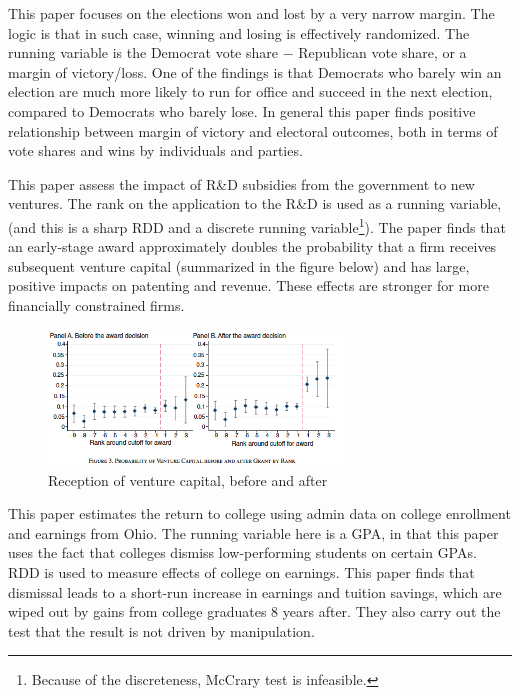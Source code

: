 \begin{mdframed}[backgroundcolor=yellow!5] 
\begin{example}[Lee, 2007] This paper focuses on the elections won and lost by a very narrow margin. The logic is that in such case, winning and losing is effectively randomized. The running variable is the Democrat vote share $-$ Republican vote share, or a margin of victory/loss. One of the findings is that Democrats who barely win an election are much more likely to run for office and succeed in the next election, compared to Democrats who barely lose. In general this paper finds positive relationship between margin of victory and electoral outcomes, both in terms of vote shares and wins by individuals and parties. 
\end{example}


\begin{example}[Howell, 2017] This paper assess the impact of R\&D subsidies from the government to new ventures. The rank on the application to the R\&D is used as a running variable, (and this is a sharp RDD and a discrete running variable\footnote{Because of the discreteness, McCrary test is infeasible.}).  The paper finds that an early-stage award approximately doubles the probability that a firm receives subsequent venture capital (summarized in the figure below) and has large, positive impacts on patenting and revenue. These effects are stronger for more financially constrained firms.
\end{example}
\begin{figure}[H]
\centering
\includegraphics[width=0.7\textwidth, keepaspectratio]{RD_fig.png}
\caption{Reception of venture capital, before and after}
\end{figure}
\begin{example} This paper estimates the return to college using admin data on college enrollment and earnings from Ohio. The running variable here is a GPA, in that this paper uses the fact that colleges dismiss low-performing students on certain GPAs. RDD is used to measure effects of college on earnings. This paper finds that dismissal leads to a short-run increase in earnings and tuition savings, which are wiped out by gains from college graduates 8 years after. They also carry out the test that the result is not driven by manipulation.
\end{example}
\end{mdframed}


